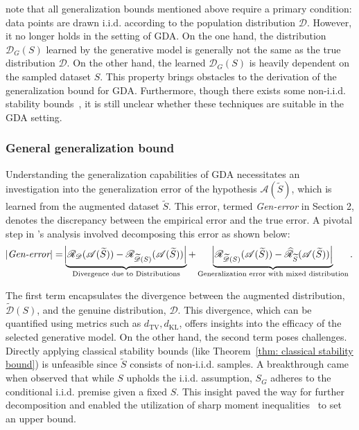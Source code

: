 \documentclass[preprint,12pt,authoryear]{elsarticle}
\newcommand{\sA}{{\mathscr A}}
\newcommand{\sD}{{\mathscr D}}
\newcommand{\sR}{{\mathscr R}}
\newcommand{\DG}{\sD_G(S)}
\newcommand{\Saug}{\widetilde{S}}
\newcommand{\Daug}{\widetilde{\sD}}
\begin{document}
\cite{171_theory} note that all generalization bounds mentioned above require a primary condition: data points are drawn i.i.d. according to the population distribution $\sD$. However, it no longer holds in the setting of GDA. On the one hand, the distribution $\DG$ learned by the generative model is generally not the same as the true distribution $\sD$. On the other hand, the learned $\DG$ is heavily dependent on the sampled dataset $S$. This property brings obstacles to the derivation of the generalization bound for GDA. Furthermore, though there exists some non-i.i.d. stability bounds~\cite{167_theory,168_theory,169_theory}, it is still unclear whether these techniques are suitable in the GDA setting.



\subsubsection{General generalization bound}
\label{sec: General generalization bound}

Understanding the generalization capabilities of GDA necessitates an investigation into the generalization error of the hypothesis $\sA(\Saug)$, which is learned from the augmented dataset $\Saug$. This error, termed \textit{Gen-error} in Section 2, denotes the discrepancy between the empirical error and the true error. A pivotal step in \cite{171_theory}'s analysis involved decomposing this error as shown below:
\begin{equation}
\abs{\textit{{Gen-error}}} = \underbrace{\abs{\sR_{\sD}(\sA(\Saug)) - \sR_{\Daug(S)}(\sA(\Saug))}}_{\text{Divergence due to Distributions}} + \underbrace{\abs{ \sR_{\Daug(S)}(\sA(\Saug)) - \widehat{\sR}_{\Saug}(\sA(\Saug))}}_{\text{Generalization error with mixed distribution}}.
\end{equation}

The first term encapsulates the divergence between the augmented distribution, $\Daug(S)$, and the genuine distribution, $\sD$. This divergence, which can be quantified using metrics such as $d_{\mathrm{TV}}, d_{\mathrm{KL}}$, offers insights into the efficacy of the selected generative model. On the other hand, the second term poses challenges. Directly applying classical stability bounds (like Theorem~\ref{thm: classical stability bound}) is unfeasible since $\Saug$ consists of non-i.i.d. samples. A breakthrough came when \cite{171_theory} observed that while $S$ upholds the i.i.d. assumption, $S_G$ adheres to the conditional i.i.d. premise given a fixed $S$. This insight paved the way for further decomposition and enabled the utilization of sharp moment inequalities~\cite{166_theory} to set an upper bound.
\end{document}
